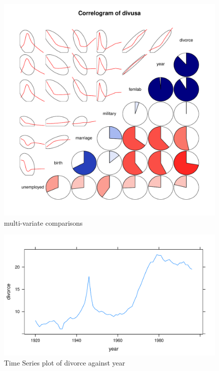 \documentclass{article}\usepackage[]{graphicx}\usepackage[]{color}
\makeatletter
\def\maxwidth{ %
  \ifdim\Gin@nat@width>\linewidth
    \linewidth
  \else
    \Gin@nat@width
  \fi
}
\newenvironment{knitrout}{}{} %
\makeatother
\begin{document}
\begin{knitrout}
\color{fgcolor}\begin{figure}
\includegraphics[width=\maxwidth]{figure/corrgram_custom-1} \caption[multi-variate comparisons]{multi-variate comparisons}\label{fig:corrgram_custom}
\end{figure}


\end{knitrout}





\begin{knitrout}
\color{fgcolor}\begin{figure}
\includegraphics[width=\maxwidth]{figure/time_series-1} \caption[Time Series  plot of divorce against year]{Time Series  plot of divorce against year}\label{fig:time_series}
\end{figure}


\end{knitrout}
\end{document}
